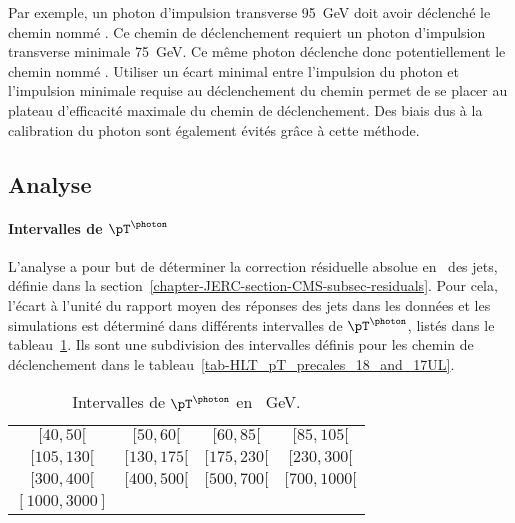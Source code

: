 \par Par exemple, un photon d'impulsion transverse \SI{95}{\GeV} doit avoir déclenché le chemin nommé .
Ce chemin de déclenchement requiert un photon d'impulsion transverse minimale \SI{75}{\GeV}.
Ce même photon déclenche donc potentiellement le chemin nommé .
Utiliser un écart minimal entre l'impulsion du photon et l'impulsion minimale requise au déclenchement du chemin permet de se placer au plateau d'efficacité maximale du chemin de déclenchement.
Des biais dus à la calibration du photon sont également évités grâce à cette méthode.
\subsection{Analyse}\label{chapter-JERC-section-JES-subsec-analyse}
\paragraph{Intervalles de $\pT^{\photon}$}
L'analyse a pour but de déterminer la correction résiduelle absolue en \pT\ des jets, définie dans la section~\ref{chapter-JERC-section-CMS-subsec-residuals}.
Pour cela, l'écart à l'unité du rapport moyen des réponses des jets dans les données et les simulations est déterminé dans différents intervalles de $\pT^{\photon}$, listés dans le tableau~\ref{tab-pT_photon_intervalles}.
Ils sont une subdivision des intervalles définis pour les chemin de déclenchement dans le tableau~\ref{tab-HLT_pT_precales_18_and_17UL}.
\begin{table}[h]
\centering
\begin{tabular}{cccc}
\toprule
$[\num{40}, \num{50}[$ & $[\num{50}, \num{60}[$ & $[\num{60}, \num{85}[$ & $[\num{85}, \num{105}[$ \\
$[\num{105}, \num{130}[$ & $[\num{130}, \num{175}[$ & $[\num{175}, \num{230}[$ & $[\num{230}, \num{300}[$ \\
$[\num{300}, \num{400}[$ & $[\num{400}, \num{500}[$ & $[\num{500}, \num{700}[$ & $[\num{700}, \num{1000}[$ \\
$[\num{1000}, \num{3000}]$ \\
\bottomrule
\end{tabular}
\caption[Intervalles de $\pT^{\photon}$.]{Intervalles de $\pT^{\photon}$ en \SI{}{\GeV}.}
\label{tab-pT_photon_intervalles}
\end{table}
